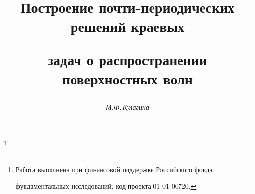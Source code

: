 

 


%


\newcommand{\ch}{\operatorname{ch}} 


\newcommand{\sh}{\operatorname{sh}} 


\newcommand{\th}{\operatorname{th}} 


\newcommand{\tts}[1]{} 


 




\setcounter{page}{38} 












 


\author{\it М.Ф.\,Кулагина} 




\title{Построение почти-периодических решений краевых  


задач о распространении поверхностных волн} 


\thanks{Работа выполнена при финансовой поддержке Российского фонда


фундаментальных исследований, код проекта 01-01-00720.}


 


\date{} 




\pagestyle{plain} %


 




